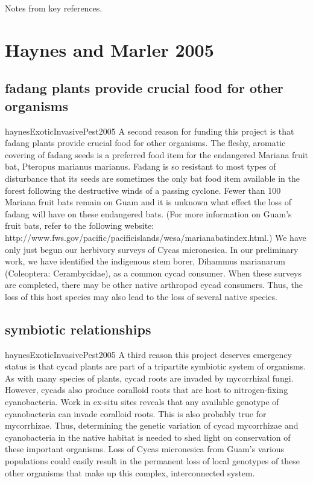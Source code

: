 
\begin{appendices}
	
	Notes from key references.

\section{Haynes and Marler 2005}

\subsection{fadang plants provide crucial food for other organisms}
\begin{displaycquote}{haynesExoticInvasivePest2005}
A second reason for funding this project is that fadang plants provide crucial food for other organisms.
The fleshy, aromatic covering of fadang seeds is a preferred food item for the endangered Mariana
fruit bat, Pteropus marianus marianus. Fadang is so resistant to most types of disturbance that its
seeds are sometimes the only bat food item available in the forest following the destructive winds of a
passing cyclone. Fewer than 100 Mariana fruit bats remain on Guam and it is unknown what effect the
loss of fadang will have on these endangered bats. (For more information on Guam’s fruit bats, refer
to the following website: http://www.fws.gov/pacific/pacificislands/wesa/marianabatindex.html.)
We have only just begun our herbivory surveys of Cycas micronesica. In our preliminary work, we
have identified the indigenous stem borer, Dihammus marianarum (Coleoptera: Cerambycidae), as a
common cycad consumer. When these surveys are completed, there may be other native arthropod
cycad consumers. Thus, the loss of this host species may also lead to the loss of several native species.
\end{displaycquote}

\subsection{symbiotic relationships}
\begin{displaycquote}{haynesExoticInvasivePest2005}
A third reason this project deserves emergency status is that cycad plants are part of a tripartite
symbiotic system of organisms. As with many species of plants, cycad roots are invaded by
mycorrhizal fungi. However, cycads also produce coralloid roots that are host to nitrogen-fixing
cyanobacteria. Work in ex-situ sites reveals that any available genotype of cyanobacteria can invade
coralloid roots. This is also probably true for mycorrhizae. Thus, determining the genetic variation of
cycad mycorrhizae and cyanobacteria in the native habitat is needed to shed light on conservation of
these important organisms. Loss of Cycas micronesica from Guam’s various populations could easily
result in the permanent loss of local genotypes of these other organisms that make up this complex,
interconnected system.
\end{displaycquote}


\end{appendices}
